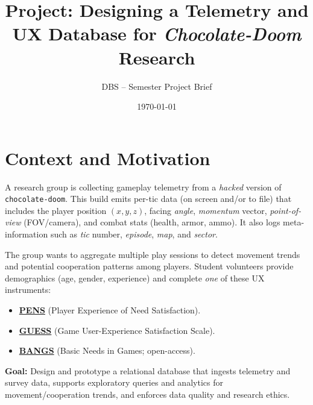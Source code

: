 \documentclass[11pt]{article}
\title{\vspace{-1em}Project: Designing a Telemetry and UX Database for \textit{Chocolate-Doom} Research}
\author{DBS -- Semester Project Brief}
\date{\today}
\begin{document}
\maketitle
\tableofcontents

\section{Context and Motivation}
A research group is collecting gameplay telemetry from a \emph{hacked} version of \texttt{chocolate-doom}. This build emits per-tic data (on screen and/or to file) that includes the player position $(x,y,z)$, facing \emph{angle}, \emph{momentum} vector, \emph{point-of-view} (FOV/camera), and combat stats (health, armor, ammo). It also logs meta-information such as \emph{tic} number, \emph{episode}, \emph{map}, and \emph{sector}.

The group wants to aggregate multiple play sessions to detect movement trends and potential cooperation patterns among players. Student volunteers provide demographics (age, gender, experience) and complete \emph{one} of these UX instruments:
\begin{itemize}[leftmargin=*]
  \item \href{https://selfdeterminationtheory.org/player-experience-of-needs-satisfaction-pens}{\textbf{PENS}} (Player Experience of Need Satisfaction).
  \item \href{https://uxpajournal.org/wp-content/uploads/sites/7/pdf/JUS_Keebler_GUESS-18%20Scoring%20Guidelines.pdf}{\textbf{GUESS}} (Game User-Experience Satisfaction Scale).
  \item \href{https://www.sciencedirect.com/science/article/pii/S1071581924000739}{\textbf{BANGS}} (Basic Needs in Games; open-access).
\end{itemize}

\textbf{Goal:} Design and prototype a relational database that ingests telemetry and survey data, supports exploratory queries and analytics for movement/cooperation trends, and enforces data quality and research ethics.
\end{document}
